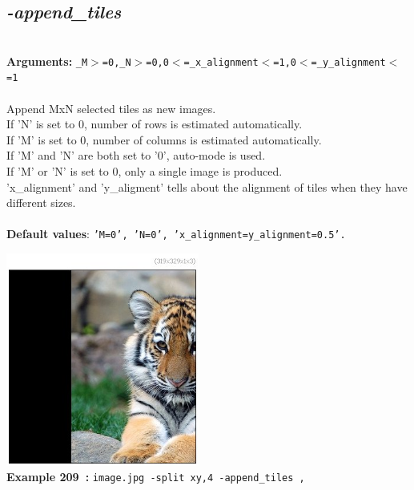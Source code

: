 \documentclass[a4paper,11pt,twoside]{book}
\begin{document}
\subsection{\emph{-append\_tiles} }\vspace*{-0.5em}
~\\\textbf{Arguments: } 
{\small \texttt{\_M$>$=0,\_N$>$=0,0$<$=\_x\_alignment$<$=1,0$<$=\_y\_alignment$<$=1}}\\~\\
Append MxN selected tiles as new images.
~\\If 'N' is set to 0, number of rows is estimated automatically.
~\\If 'M' is set to 0, number of columns is estimated automatically.
~\\If 'M' and 'N' are both set to '0', auto-mode is used.
~\\If 'M' or 'N' is set to 0, only a single image is produced.
~\\'x\_alignment' and 'y\_aligment' tells about the alignment of tiles when they have different sizes.
~\\~\\\textbf{Default values}: {\small \texttt{'M=0', 'N=0', 'x\_alignment=y\_alignment=0.5'.}}
\begin{center}\includegraphics[keepaspectratio=true,height=7cm,width=\textwidth]{img/gmic_def209.jpg}\\
{\footnotesize \textbf{Example 209~:} \texttt{image.jpg -split xy,4 -append\_tiles ,}}
\end{center}
\end{document}
